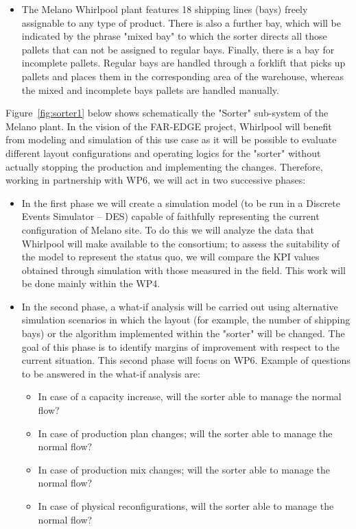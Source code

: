 \begin{itemize}
\item The Melano Whirlpool plant features 18 shipping lines (bays) freely assignable to any type of product. There is also a further bay, which will be indicated by the phrase "mixed bay" to which the sorter directs all those pallets that can not be assigned to regular bays. Finally, there is a bay for incomplete pallets. Regular bays are handled through a forklift that picks up pallets and places them in the corresponding area of the warehouse, whereas the  mixed and incomplete bays pallets are handled manually.
\end{itemize}
	
Figure~\ref{fig:sorter1} below shows schematically the "Sorter" sub-system of the Melano plant.
In the vision of the FAR-EDGE project, Whirlpool will benefit from modeling and simulation of this use case as it will be possible to evaluate different layout configurations and operating logics for the "sorter" without actually stopping the production and implementing the changes. Therefore, working in partnership with WP6, we will act in two successive phases:
\begin{itemize}
\item In the first phase we will create a simulation model (to be run in a Discrete Events Simulator – DES) capable of faithfully representing the current configuration of Melano site. To do this we will analyze the data that Whirlpool will make available to the consortium; to assess the suitability of the model to represent the status quo, we will compare the KPI values obtained through simulation with those measured in the field. This work will be done mainly within the WP4.
\item In the second phase, a what-if analysis will be carried out using alternative simulation scenarios in which the layout (for example, the number of shipping bays) or the algorithm implemented within the "sorter" will be changed. The goal of this phase is to identify margins of improvement with respect to the current situation. This second phase will focus on WP6. Example of questions to be answered in the what-if analysis are:
\begin{itemize}
\item In case of a capacity increase, will the sorter able to manage the normal flow?
\item In case of production plan changes; will the sorter able to manage the normal flow? 
\item In case of production mix changes; will the sorter able to manage the normal flow? 
\item In case of physical reconfigurations, will the sorter able to manage the normal flow? 
\end{itemize}
\end{itemize}


